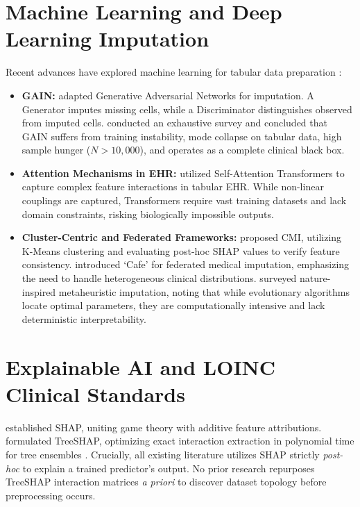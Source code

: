 \documentclass[MTech]{ugthesis}
\begin{document}
\section{Machine Learning and Deep Learning Imputation}\label{sec:lit_ml}
Recent advances have explored machine learning for tabular data preparation \citep{alabadla2022systematic}:
\begin{itemize}
    \item \textbf{\ac{GAIN}:} \citet{yoon2018gain} adapted Generative Adversarial Networks for imputation. A Generator imputes missing cells, while a Discriminator distinguishes observed from imputed cells. \citet{shahbazian2023generative} conducted an exhaustive survey and concluded that \ac{GAIN} suffers from training instability, mode collapse on tabular data, high sample hunger ($N > 10,000$), and operates as a complete clinical black box.
    \item \textbf{Attention Mechanisms in \ac{EHR}:} \citet{kowsar2024attention} utilized Self-Attention Transformers to capture complex feature interactions in tabular \ac{EHR}. While non-linear couplings are captured, Transformers require vast training datasets and lack domain constraints, risking biologically impossible outputs.
    \item \textbf{Cluster-Centric and Federated Frameworks:} \citet{gupta2024cmi} proposed \ac{CMI}, utilizing K-Means clustering and evaluating post-hoc \ac{SHAP} values to verify feature consistency. \citet{min2025cafe} introduced `Cafe' for federated medical imputation, emphasizing the need to handle heterogeneous clinical distributions. \citet{chiu2022missing} surveyed nature-inspired metaheuristic imputation, noting that while evolutionary algorithms locate optimal parameters, they are computationally intensive and lack deterministic interpretability.
\end{itemize}

\section{Explainable AI and LOINC Clinical Standards}\label{sec:lit_xai}\label{sec:lit_loinc}
\citet{lundberg2017unified} established \ac{SHAP}, uniting game theory \citep{shapley1953value} with additive feature attributions. \citet{lundberg2020local} formulated Tree\ac{SHAP}, optimizing exact interaction extraction in polynomial time for tree ensembles \citep{chen2016xgboost}. Crucially, all existing literature utilizes \ac{SHAP} strictly \textit{post-hoc} to explain a trained predictor's output. No prior research repurposes Tree\ac{SHAP} interaction matrices \textit{a priori} to discover dataset topology before preprocessing occurs.
\end{document}
